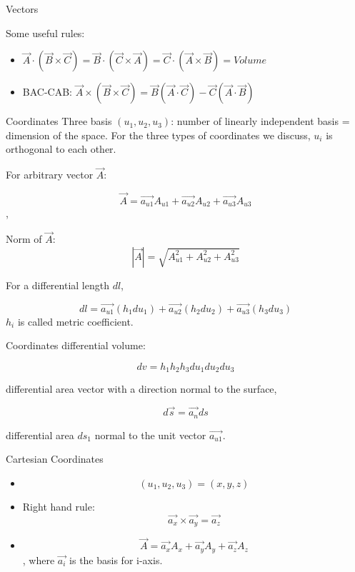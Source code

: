 \documentclass[xcolor={dvipsnames}]{beamer}
\begin{document}
\begin{frame}{Vectors}
\begin{block}{Some useful rules:}
\begin{itemize}
	\item $\vec{A}\cdot(\vec{B}\times\vec{C}) = \vec{B}\cdot(\vec{C}\times\vec{A}) = \vec{C}\cdot(\vec{A}\times\vec{B}) = Volume$
    \item BAC-CAB:
        $\vec{A}\times(\vec{B}\times\vec{C}) = \vec{B}(\vec{A}\cdot\vec{C}) - \vec{C}(\vec{A}\cdot\vec{B})$
\end{itemize}
\end{block}


\end{frame}


\begin{frame}{Coordinates}
Three basis $(u_1, u_2, u_3)$: number of linearly independent basis = dimension of the space. For the three types of coordinates we discuss, $u_i$ is orthogonal to each other.

For arbitrary vector $\vec{A}$:

$$\vec{A} = \vec{a_{u1}}A_{u1} + \vec{a_{u2}}A_{u2} + \vec{a_{u3}}A_{u3}$$,

Norm of $\vec{A}$:
$$|\vec{A}| = \sqrt{A_{u1}^2 + A_{u2}^2 + A_{u3}^2}$$

For a differential length $dl$, 

$$dl = \vec{a_{u1}}(h_1du_1) + \vec{a_{u2}}(h_2du_2) + \vec{a_{u3}}(h_3du_3)$$ $h_i$ is called metric coefficient.

\end{frame}
\begin{frame}{Coordinates}
differential volume:

$$dv = h_1h_2h_3du_1du_2du_3$$

differential area vector with a direction normal to the surface,

$$d\vec{s} = \vec{a_n}ds$$

differential area $ds_1$ normal to the unit vector $\vec{a_{u1}}$.
\end{frame}
\begin{frame}{Cartesian Coordinates}
\begin{itemize}
    \item $$(u_1, u_2, u_3) = (x, y, z)$$
    \item Right hand rule:
    $$
    \vec{a_x}\times\vec{a_y} = \vec{a_z}
    $$
    \item 
    $$
    \vec{A} = \vec{a_x}A_x + \vec{a_y}A_y + \vec{a_z}A_z
    $$,
    where $\vec{a_i}$ is the basis for i-axis.
    

\end{itemize}
\end{frame}
\end{document}
